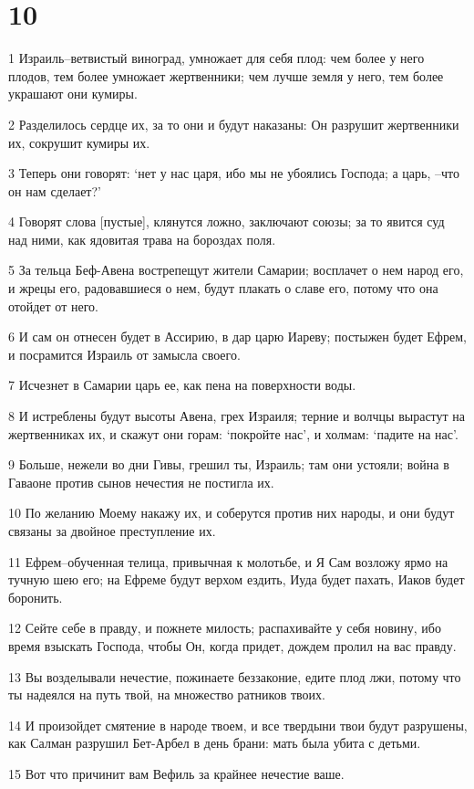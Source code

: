 \chapter{10}

\par 1 Израиль--ветвистый виноград, умножает для себя плод: чем более у него плодов, тем более умножает жертвенники; чем лучше земля у него, тем более украшают они кумиры.
\par 2 Разделилось сердце их, за то они и будут наказаны: Он разрушит жертвенники их, сокрушит кумиры их.
\par 3 Теперь они говорят: `нет у нас царя, ибо мы не убоялись Господа; а царь, --что он нам сделает?'
\par 4 Говорят слова [пустые], клянутся ложно, заключают союзы; за то явится суд над ними, как ядовитая трава на бороздах поля.
\par 5 За тельца Беф-Авена вострепещут жители Самарии; восплачет о нем народ его, и жрецы его, радовавшиеся о нем, будут плакать о славе его, потому что она отойдет от него.
\par 6 И сам он отнесен будет в Ассирию, в дар царю Иареву; постыжен будет Ефрем, и посрамится Израиль от замысла своего.
\par 7 Исчезнет в Самарии царь ее, как пена на поверхности воды.
\par 8 И истреблены будут высоты Авена, грех Израиля; терние и волчцы вырастут на жертвенниках их, и скажут они горам: `покройте нас', и холмам: `падите на нас'.
\par 9 Больше, нежели во дни Гивы, грешил ты, Израиль; там они устояли; война в Гаваоне против сынов нечестия не постигла их.
\par 10 По желанию Моему накажу их, и соберутся против них народы, и они будут связаны за двойное преступление их.
\par 11 Ефрем--обученная телица, привычная к молотьбе, и Я Сам возложу ярмо на тучную шею его; на Ефреме будут верхом ездить, Иуда будет пахать, Иаков будет боронить.
\par 12 Сейте себе в правду, и пожнете милость; распахивайте у себя новину, ибо время взыскать Господа, чтобы Он, когда придет, дождем пролил на вас правду.
\par 13 Вы возделывали нечестие, пожинаете беззаконие, едите плод лжи, потому что ты надеялся на путь твой, на множество ратников твоих.
\par 14 И произойдет смятение в народе твоем, и все твердыни твои будут разрушены, как Салман разрушил Бет-Арбел в день брани: мать была убита с детьми.
\par 15 Вот что причинит вам Вефиль за крайнее нечестие ваше.


